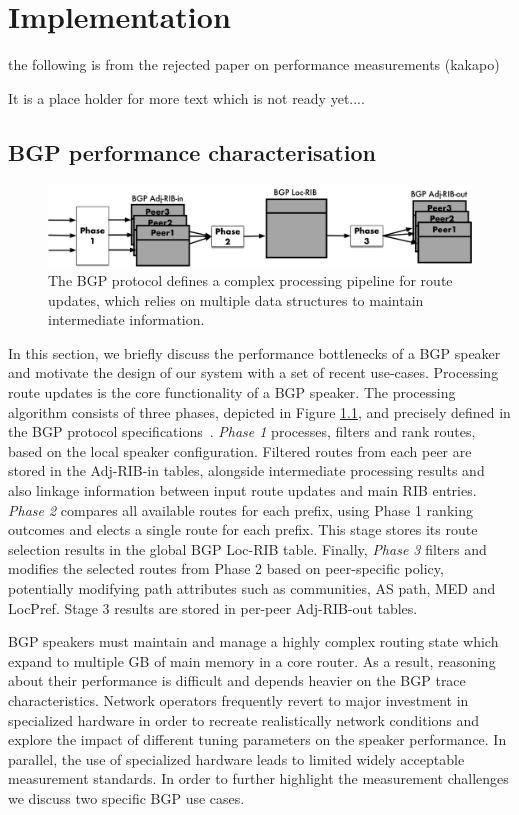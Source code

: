 \chapter{Implementation}
 {\color{red} the following is from the rejected paper on performance measurements (kakapo)

  It is a place holder for more text which is not ready yet....
 }
\section{BGP performance characterisation}


\begin{figure}[h!]
	\includegraphics[width=\linewidth]{images/routeSelection.pdf}
	\caption{The BGP protocol defines a complex processing pipeline for route updates, which relies on multiple data structures to maintain intermediate information.} \label{fig:routeSelection}
\end{figure}

In this section, we briefly discuss the performance bottlenecks of a BGP speaker
and motivate the design of our system with a set of recent use-cases.
Processing route updates is the core functionality of a BGP speaker. The
processing algorithm consists of three phases, depicted in
Figure \ref{fig:routeSelection}, and precisely defined in the BGP protocol
specifications~\cite{rfc4271}. {\it Phase 1} processes, filters and rank
routes, based on the local speaker configuration. Filtered routes from each
peer are stored in the Adj-RIB-in tables, alongside intermediate processing
results and also linkage information between input route updates and main RIB
entries.  {\it Phase 2} compares all available routes for each prefix, using
Phase 1 ranking outcomes and elects a single route for each prefix.  This stage
stores its route selection results in the global BGP Loc-RIB table.  Finally,
{\it Phase 3} filters and modifies the selected routes from Phase 2 based on
peer-specific policy, potentially modifying path attributes such as
communities, AS path, MED and LocPref.
Stage 3 results are stored in per-peer Adj-RIB-out tables.

BGP speakers must maintain and manage a highly complex routing state which
expand to multiple GB of main memory in a core router. As a result, reasoning
about their performance is difficult and depends heavier on the BGP trace
characteristics. Network operators frequently revert to major investment in
specialized hardware in order to recreate realistically network conditions and
explore the impact of different tuning parameters on the speaker performance.
In parallel, the use of specialized hardware leads to limited widely acceptable
measurement standards. In order to further highlight the measurement challenges
we discuss two specific BGP use cases.

